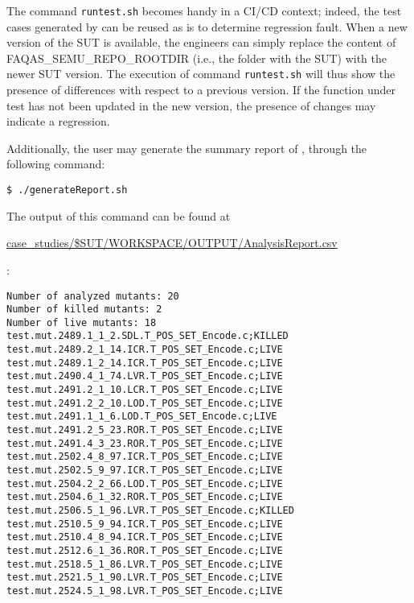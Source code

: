The command \texttt{runtest.sh} becomes handy in a CI/CD context; indeed, the test cases generated by \SEMUS can be reused as is to determine regression fault. When a new version of the SUT is available, the engineers can simply replace the content of FAQAS\_SEMU\_REPO\_ROOTDIR (i.e., the folder with the SUT) with the newer SUT version. The execution of command \texttt{runtest.sh} will thus show the presence of differences with respect to a previous version. If the function under test has not been updated in the new version, the presence of changes may indicate a regression.

Additionally, the user may generate the summary report of \SEMUS, through the following command:

\begin{lstlisting}[language={}, label=listing:semus_results]
 $ ./generateReport.sh
\end{lstlisting}


The output of this command can be found at \begin{scriptsize}\url{case_studies/$SUT/WORKSPACE/OUTPUT/AnalysisReport.csv}\end{scriptsize}:

\begin{lstlisting}[language={}]
Number of analyzed mutants: 20
Number of killed mutants: 2
Number of live mutants: 18
test.mut.2489.1_1_2.SDL.T_POS_SET_Encode.c;KILLED
test.mut.2489.2_1_14.ICR.T_POS_SET_Encode.c;LIVE
test.mut.2489.1_2_14.ICR.T_POS_SET_Encode.c;LIVE
test.mut.2490.4_1_74.LVR.T_POS_SET_Encode.c;LIVE
test.mut.2491.2_1_10.LCR.T_POS_SET_Encode.c;LIVE
test.mut.2491.2_2_10.LOD.T_POS_SET_Encode.c;LIVE
test.mut.2491.1_1_6.LOD.T_POS_SET_Encode.c;LIVE
test.mut.2491.2_5_23.ROR.T_POS_SET_Encode.c;LIVE
test.mut.2491.4_3_23.ROR.T_POS_SET_Encode.c;LIVE
test.mut.2502.4_8_97.ICR.T_POS_SET_Encode.c;LIVE
test.mut.2502.5_9_97.ICR.T_POS_SET_Encode.c;LIVE
test.mut.2504.2_2_66.LOD.T_POS_SET_Encode.c;LIVE
test.mut.2504.6_1_32.ROR.T_POS_SET_Encode.c;LIVE
test.mut.2506.5_1_96.LVR.T_POS_SET_Encode.c;KILLED
test.mut.2510.5_9_94.ICR.T_POS_SET_Encode.c;LIVE
test.mut.2510.4_8_94.ICR.T_POS_SET_Encode.c;LIVE
test.mut.2512.6_1_36.ROR.T_POS_SET_Encode.c;LIVE
test.mut.2518.5_1_86.LVR.T_POS_SET_Encode.c;LIVE
test.mut.2521.5_1_90.LVR.T_POS_SET_Encode.c;LIVE
test.mut.2524.5_1_98.LVR.T_POS_SET_Encode.c;LIVE
\end{lstlisting}